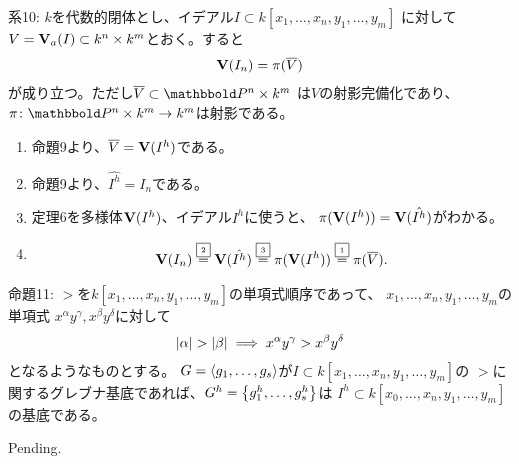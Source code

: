 \begin{framed}
  系10:
  $k$を代数的閉体とし、イデアル$I\subset k[x_1,\dots,x_n,y_1,\dots,y_m]$
  に対して$V=\textbf V_a(I)\subset k^n \times k^m$とおく。すると
  \begin{align}
    \textbf V(I_n) = \pi(\overline V)
  \end{align}
  が成り立つ。ただし$\overline V \subset \P^n \times k^m$
  は$V$の射影完備化であり、$\pi\colon \P^n \times k^m \to k^m$は射影である。
\end{framed}
\begin{myproof}
  \begin{enumerate}
    \item 命題9より、$\overline V = \textbf V(I^h)$である。
    \item
    命題9より、$\hat{I^h} = I_n$である。
    \item
    定理6を多様体$\textbf V(I^h)$、イデアル$I^h$に使うと、
    $\pi(\textbf V(I^h)) = \textbf V(\hat{I^h})$がわかる。
    \item
    \begin{align}
      \textbf V(I_n)
      \overset{\text{\fbox{\tiny 2}}}{=}
      \textbf V(\hat{I^h})
      \overset{\text{\fbox{\tiny 3}}}{=}
      \pi(\textbf V(I^h))
      \overset{\text{\fbox{\tiny 1}}}{=}
      \pi(\overline V).
    \end{align}
  \end{enumerate}
\end{myproof}

\begin{framed}
  命題11:
  $>$を$k[x_1,\dots,x_n,y_1,\dots,y_m]$の単項式順序であって、
  $x_1,\dots,x_n,y_1,\dots,y_m$の単項式
  $x^\alpha y^\gamma, x^\beta y^\delta $に対して
  \begin{align}
    \left|\alpha\right| > \left|\beta\right| \implies
    x^\alpha y^\gamma > x^\beta y^\delta
  \end{align}
  となるようなものとする。
  $G=\left\langle g_1,\dots,g_s \right\rangle$が$I\subset k[x_1,\dots,x_n,y_1,\dots,y_m]$の
  $>$に関するグレブナ基底であれば、$G^h = \left\{g_1^h,\dots,g_s^h\right\}$は
  $I^h \subset k[x_0,\dots,x_n,y_1,\dots,y_m]$の基底である。
\end{framed}
\begin{myproof}
  Pending.
\end{myproof}

